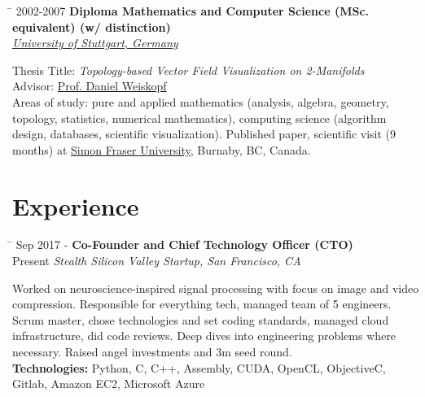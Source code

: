 \documentclass[10pt]{article} %
\newlength{\marginwidth}
\newlength{\smallertextwidth}
\newcommand{\education}[4]{
\begin{tabbing}%
\hspace{\marginwidth}\=\kill%
{#1} \> \textbf{#2}\\
\>\+ \textit{#3}\\[5pt]
\begin{minipage}{\smallertextwidth}
\vspace{5pt}
#4
\end{minipage}
\end{tabbing}
}
\newcommand{\job}[5]{
\begin{tabbing}
\hspace{\marginwidth} \= \kill
{#1} \> \textbf{#3}\\
{#2} \>\+ \textit{#4}\\[5pt]
\begin{minipage}{\smallertextwidth}
\vspace{2mm}
#5
\end{minipage}
\end{tabbing}
\vspace{2mm}
}
\begin{document}
\education
{2002-2007}
{Diploma Mathematics and Computer Science (MSc. equivalent) \textmd{(w/ distinction)}}
{\href{https://uni-stuttgart.de}{University of Stuttgart, Germany}}
{
Thesis Title: \textit{Topology-based Vector Field Visualization on 2-Manifolds}\\
Advisor: \href{https://www.vis.uni-stuttgart.de/institut/mitarbeiter/Weiskopf-00001/}{Prof. Daniel Weiskopf}\\[5pt]
%
Areas of study: pure and applied mathematics (analysis, algebra, geometry, topology, statistics, numerical mathematics), 
computing science (algorithm design, databases, scientific visualization).
Published paper, scientific visit (9 months) at \href{https://www.sfu.ca/}{Simon Fraser University}, Burnaby, BC, Canada. 
}



\section{Experience}
%
\job
{Sep 2017 -}{Present}
{Co-Founder and Chief Technology Officer (CTO)}
{Stealth Silicon Valley Startup\textup{, San Francisco, CA}}
{
Worked on neuroscience-inspired signal processing with focus on image and video compression. 
Responsible for everything tech, managed team of 5 engineers. Scrum master, chose technologies and
set coding standards, managed cloud infrastructure, did code reviews. Deep dives into engineering
problems where necessary. Raised angel investments and 3m seed round.\\[5pt]
\textbf{Technologies:} Python, C, C++, Assembly, CUDA, OpenCL, ObjectiveC, Gitlab, Amazon EC2, Microsoft Azure
}
\end{document}
